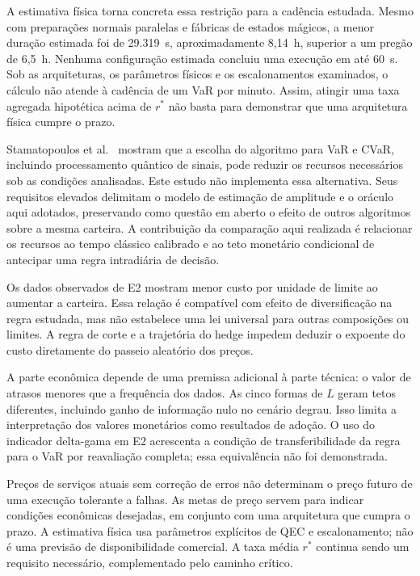 \documentclass[conference,a4paper]{IEEEtran}
\begin{document}
A estimativa física torna concreta essa restrição para a cadência estudada. Mesmo com preparações normais paralelas e fábricas de estados mágicos, a menor duração estimada foi de 29.319~s, aproximadamente 8,14~h, superior a um pregão de 6,5~h. Nenhuma configuração estimada concluiu uma execução em até 60~s. Sob as arquiteturas, os parâmetros físicos e os escalonamentos examinados, o cálculo não atende à cadência de um VaR por minuto. Assim, atingir uma taxa agregada hipotética acima de \(r^*\) não basta para demonstrar que uma arquitetura física cumpre o prazo.

Stamatopoulos et al.~\cite{stamatopoulos2024risk} mostram que a escolha do algoritmo para VaR e CVaR, incluindo processamento quântico de sinais, pode reduzir os recursos necessários sob as condições analisadas. Este estudo não implementa essa alternativa. Seus requisitos elevados delimitam o modelo de estimação de amplitude e o oráculo aqui adotados, preservando como questão em aberto o efeito de outros algoritmos sobre a mesma carteira. A contribuição da comparação aqui realizada é relacionar os recursos ao tempo clássico calibrado e ao teto monetário condicional de antecipar uma regra intradiária de decisão.

Os dados observados de E2 mostram menor custo por unidade de limite ao aumentar a carteira. Essa relação é compatível com efeito de diversificação na regra estudada, mas não estabelece uma lei universal para outras composições ou limites. A regra de corte e a trajetória do hedge impedem deduzir o expoente do custo diretamente do passeio aleatório dos preços.

A parte econômica depende de uma premissa adicional à parte técnica: o valor de atrasos menores que a frequência dos dados. As cinco formas de \(L\) geram tetos diferentes, incluindo ganho de informação nulo no cenário degrau. Isso limita a interpretação dos valores monetários como resultados de adoção. O uso do indicador delta-gama em E2 acrescenta a condição de transferibilidade da regra para o VaR por reavaliação completa; essa equivalência não foi demonstrada.

Preços de serviços atuais sem correção de erros não determinam o preço futuro de uma execução tolerante a falhas. As metas de preço servem para indicar condições econômicas desejadas, em conjunto com uma arquitetura que cumpra o prazo. A estimativa física usa parâmetros explícitos de QEC e escalonamento; não é uma previsão de disponibilidade comercial. A taxa média \(r^*\) continua sendo um requisito necessário, complementado pelo caminho crítico.
\end{document}
